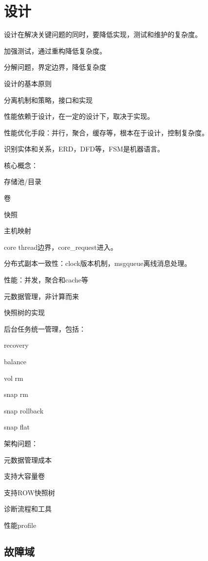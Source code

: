 \chapter{设计}

设计在解决关键问题的同时，要降低实现，测试和维护的复杂度。

加强测试，通过重构降低复杂度。

分解问题，界定边界，降低复杂度

设计的基本原则

分离机制和策略，接口和实现

性能依赖于设计，在一定的设计下，取决于实现。

性能优化手段：并行，聚合，缓存等，根本在于设计，控制复杂度。

识别实体和关系，ERD，DFD等，FSM是机器语言。

核心概念：
\begin{compactenum}
\item 存储池/目录
\item 卷
\item 快照
\item 主机映射
\end{compactenum}

core thread边界，core\_request进入。

分布式副本一致性：clock版本机制，msgqueue离线消息处理。

性能：并发，聚合和cache等

元数据管理，非计算而来

快照树的实现

后台任务统一管理，包括：
\begin{compactenum}
\item recovery
\item balance
\item vol rm
\item snap rm
\item snap rollback
\item snap flat
\end{compactenum}

架构问题：
\begin{compactenum}
\item 元数据管理成本
\item 支持大容量卷
\item 支持ROW快照树
\item 诊断流程和工具
\item 性能profile
\end{compactenum}

\section{故障域}

